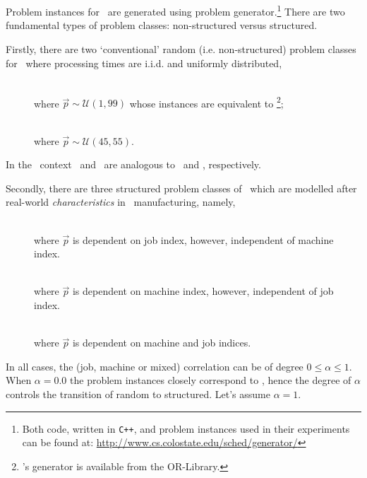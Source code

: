\section{\Fsp}\label{sec:data:FSP}
Problem instances for \FSP\  are generated using \citet{Whitley} problem 
generator.\footnote{Both code, written in \texttt{C++}, and problem instances 
used in their experiments can be found at: 
\url{http://www.cs.colostate.edu/sched/generator/}}
There are two fundamental types of problem classes: non-structured versus 
structured.

Firstly, there are two `conventional' random (i.e. non-structured) problem 
classes for \FSP\  where processing times are i.i.d. and uniformly distributed, 
\begin{description}
	\item[\Frnd]   \hfill \\
	where $\vec{p}\sim\mathcal{U}(1,99)$ whose instances are equivalent to \cite{Taillard1993}\footnote{\citeauthor{Taillard1993}'s generator is available from the OR-Library.};
	\item[\Frndn]   \hfill \\
	where $\vec{p}\sim\mathcal{U}(45,55)$.
\end{description}
In the \JSP\ context \ and \ are analogous to \ and , respectively.  

Secondly, there are three structured problem classes of \FSP\  which are modelled after real-world \emph{characteristics} in \fsp\ manufacturing, namely, 
\begin{description}
	\item[\Fjc]  \hfill \\
	where $\vec{p}$ is dependent on job index, however, independent of 
	machine index. 
	\item[\Fmc]   \hfill \\
	where $\vec{p}$ is dependent on machine index, however, independent of 
	job index. 
	\item[\Fmxc]   \hfill \\
	where $\vec{p}$ is dependent on machine and job indices. 
\end{description} 
In all cases, the (job, machine or mixed) correlation can be of degree 
$0\leq\alpha\leq1$. 
When $\alpha=0.0$ the problem instances closely correspond to , 
hence the degree of $\alpha$ controls the transition of random to structured. 
Let's assume $\alpha=1$.


